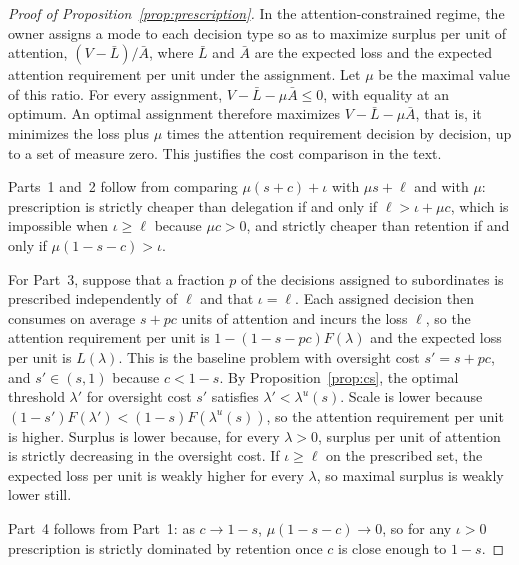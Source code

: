 \documentclass[11pt,a4paper]{article}
\theoremstyle{plain}
\begin{document}
\begin{proof}[Proof of Proposition~\ref{prop:prescription}]
In the attention-constrained regime, the owner assigns a mode to each decision type so as to maximize surplus per unit of attention, $(V - \bar L)/\bar A$, where $\bar L$ and $\bar A$ are the expected loss and the expected attention requirement per unit under the assignment. Let $\mu$ be the maximal value of this ratio. For every assignment, $V - \bar L - \mu \bar A \le 0$, with equality at an optimum. An optimal assignment therefore maximizes $V - \bar L - \mu \bar A$, that is, it minimizes the loss plus $\mu$ times the attention requirement decision by decision, up to a set of measure zero. This justifies the cost comparison in the text.

Parts~1 and~2 follow from comparing $\mu(s + c) + \iota$ with $\mu s + \ell$ and with $\mu$: prescription is strictly cheaper than delegation if and only if $\ell > \iota + \mu c$, which is impossible when $\iota \ge \ell$ because $\mu c > 0$, and strictly cheaper than retention if and only if $\mu(1 - s - c) > \iota$.

For Part~3, suppose that a fraction $p$ of the decisions assigned to subordinates is prescribed independently of $\ell$ and that $\iota = \ell$. Each assigned decision then consumes on average $s + pc$ units of attention and incurs the loss $\ell$, so the attention requirement per unit is $1 - (1 - s - pc)F(\lambda)$ and the expected loss per unit is $L(\lambda)$. This is the baseline problem with oversight cost $s' = s + pc$, and $s' \in (s, 1)$ because $c < 1 - s$. By Proposition~\ref{prop:cs}, the optimal threshold $\lambda'$ for oversight cost $s'$ satisfies $\lambda' < \lambda^u(s)$. Scale is lower because $(1 - s')F(\lambda') < (1 - s)F(\lambda^u(s))$, so the attention requirement per unit is higher. Surplus is lower because, for every $\lambda > 0$, surplus per unit of attention is strictly decreasing in the oversight cost. If $\iota \ge \ell$ on the prescribed set, the expected loss per unit is weakly higher for every $\lambda$, so maximal surplus is weakly lower still.

Part~4 follows from Part~1: as $c \to 1 - s$, $\mu(1 - s - c) \to 0$, so for any $\iota > 0$ prescription is strictly dominated by retention once $c$ is close enough to $1 - s$.
\end{proof}
\end{document}
